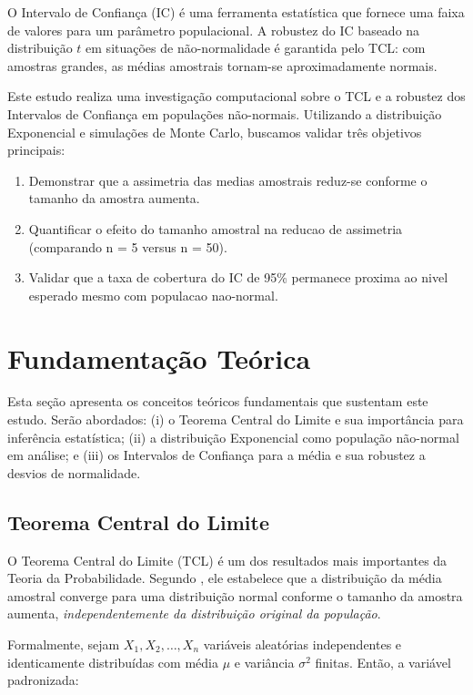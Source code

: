 \documentclass[12pt,a4paper]{article}
\begin{document}
O Intervalo de Confiança (IC) é uma ferramenta estatística que fornece uma faixa de valores para um parâmetro populacional. A robustez do IC baseado na distribuição $t$ em situações de não-normalidade é garantida pelo TCL: com amostras grandes, as médias amostrais tornam-se aproximadamente normais.

Este estudo realiza uma investigação computacional sobre o TCL e a robustez dos Intervalos de Confiança em populações não-normais. Utilizando a distribuição Exponencial e simulações de Monte Carlo, buscamos validar três objetivos principais:

\begin{enumerate}
  \item Demonstrar que a assimetria das medias amostrais reduz-se conforme o tamanho da amostra aumenta.
  \item Quantificar o efeito do tamanho amostral na reducao de assimetria (comparando n = 5 versus n = 50).
  \item Validar que a taxa de cobertura do IC de 95\% permanece proxima ao nivel esperado mesmo com populacao nao-normal.
\end{enumerate}

\section{Fundamentação Teórica}

Esta seção apresenta os conceitos teóricos fundamentais que sustentam este estudo. Serão abordados: (i) o Teorema Central do Limite e sua importância para inferência estatística; (ii) a distribuição Exponencial como população não-normal em análise; e (iii) os Intervalos de Confiança para a média e sua robustez a desvios de normalidade.

\subsection{Teorema Central do Limite}

O Teorema Central do Limite (TCL) é um dos resultados mais importantes da Teoria da Probabilidade. Segundo \cite{montgomery2016,devore2015}, ele estabelece que a distribuição da média amostral converge para uma distribuição normal conforme o tamanho da amostra aumenta, \emph{independentemente da distribuição original da população}.

Formalmente, sejam $X_1, X_2, \ldots, X_n$ variáveis aleatórias independentes e identicamente distribuídas com média $\mu$ e variância $\sigma^2$ finitas. Então, a variável padronizada:
\end{document}
